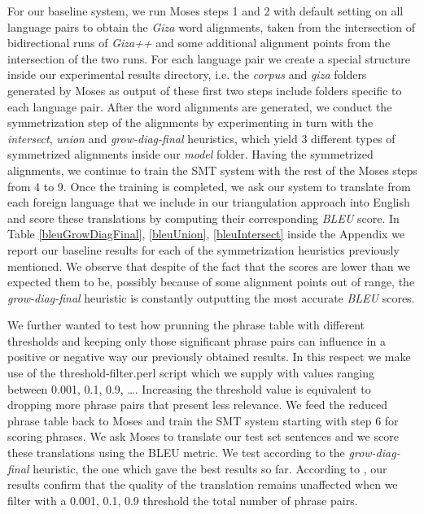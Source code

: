 \documentclass[11pt]{article}
\begin{document}
For our baseline system, we run Moses steps 1 and 2 with default setting on all language pairs to obtain the \textit{Giza} word alignments, taken from the intersection of bidirectional runs of \textit{Giza++} and some additional alignment points from the intersection of the two runs. For each language pair we create a special structure inside our experimental results directory, i.e. the \textit{corpus} and \textit{giza} folders generated by Moses as output of these first two steps include folders specific to each language pair. After the word alignments are generated, we conduct the symmetrization step of the alignments by experimenting in turn with the \textit{intersect}, \textit{union} and \textit{grow-diag-final} heuristics, which yield 3 different types of symmetrized alignments inside our \textit{model} folder. Having the symmetrized alignments, we continue to train the SMT system with the rest of the Moses steps from 4 to 9. Once the training is completed, we ask our system to translate from each foreign language that we include in our triangulation approach into English and score these translations by computing their corresponding \textit{BLEU} score. In Table \ref{bleuGrowDiagFinal}, \ref{bleuUnion}, \ref{bleuIntersect} inside the Appendix we report our baseline results for each of the symmetrization heuristics previously mentioned. We observe that despite of the fact that the scores are lower than we expected them to be, possibly because of some alignment points out of range, the \textit{grow-diag-final} heuristic is constantly outputting the most accurate \textit{BLEU} scores.

We further wanted to test how prunning the phrase table with different thresholds and keeping only those significant phrase pairs can influence in a positive or negative way our previously obtained results. In this respect we make use of the threshold-filter.perl script which we supply with values ranging between 0.001, 0.1, 0.9, \ldots. Increasing the threshold value is equivalent to dropping more phrase pairs that present less relevance. We feed the reduced phrase table back to Moses and train the SMT system starting with step 6 for scoring phrases. We ask Moses to translate our test set sentences and we score these translations using the BLEU metric.  We test according to the \textit{grow-diag-final} heuristic, the one which gave the best results so far. According to \cite{Johnson}, our results confirm that the quality of the translation remains unaffected when we filter with a 0.001, 0.1, 0.9 threshold the total number of phrase pairs. 
\end{document}
